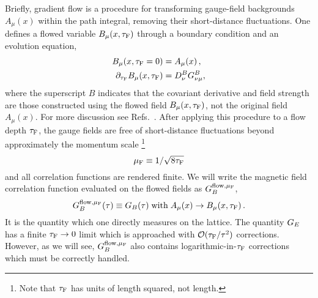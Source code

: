 \documentclass[floatfix,twocolumn,prd,showpacs,preprintnumbers,amsmath,nofootinbib,amssymb,superscriptaddress]{revtex4-2}
\def\ccites#1{Refs.~\cite{#1}} %
\begin{document}
Briefly, gradient flow is a procedure for transforming gauge-field backgrounds $A_\mu(x)$ within the path integral, removing their short-distance fluctuations.
One defines a flowed variable $B_\mu(x,\tau_\mathrm{F})$ through a boundary condition and an evolution equation,
\begin{align}
\label{flowdef}
    B_\mu(x,\tau_\mathrm{F}=0) & = A_\mu(x) \,, \nonumber
    \\
    \partial_{\tau_\mathrm{F}} B_\mu(x,\tau_\mathrm{F}) & = D_\nu^B G_{\nu\mu}^B ,
\end{align}
where the superscript $B$ indicates that the covariant derivative and field strength are those constructed using the flowed field $B_\mu(x,\tau_\mathrm{F})$, not the original field $A_\mu(x)$.
For more discussion see \ccites{Narayanan:2006rf,Luscher:2009eq,Luscher:2010iy,Luscher:2011bx}.
After applying this procedure to a flow depth $\tau_\mathrm{F}$, the gauge fields are free of short-distance fluctuations beyond approximately the momentum scale%
\footnote{Note that $\tau_\mathrm{F}$ has units of length squared, not length.}
\begin{equation}
\label{muflowdef}
    \mu_\mathrm{F} \equiv 1/\sqrt{8\tau_\mathrm{F}}
\end{equation}
and all correlation functions are rendered finite.
We will write the magnetic field correlation function evaluated on the flowed fields as $G_{B}^{\mathrm{flow}, \mu_\mathrm{F}}$,
\begin{equation}
\label{GBflowdef}
    G_{B}^{\mathrm{flow}, \mu_\mathrm{F}}(\tau) \equiv G_B(\tau) \; \mbox{with} \;
    A_\mu(x) \to B_\mu(x,\tau_\mathrm{F}) \,.
\end{equation}
It is the quantity which one directly measures on the lattice.
The quantity $G_E$ has a finite $\tau_\mathrm{F} \to 0$ limit which is approached with $\mathcal{O}(\tau_\mathrm{F}/\tau^2)$ corrections.
However, as we will see, $G_{B}^{\mathrm{flow}, \mu_\mathrm{F}}$ also contains logarithmic-in-$\tau_\mathrm{F}$ corrections which must be correctly handled.
\end{document}
